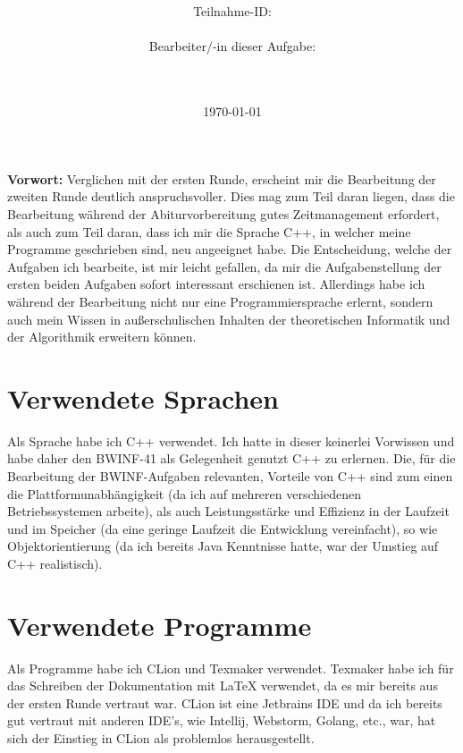 \documentclass[a4paper,10pt,ngerman]{scrartcl}
\title{\textbf{\Huge\Aufgabe}}
\author{\LARGE Teilnahme-ID: \LARGE \TeilnahmeId \\\\
\LARGE Bearbeiter/-in dieser Aufgabe: \\
\LARGE \Name\\\\}
\date{\LARGE\today}
\begin{document}
    \maketitle
    \tableofcontents

    \vspace{0.5cm}

    \textbf{Vorwort:}
    Verglichen mit der ersten Runde, erscheint mir die Bearbeitung der zweiten Runde deutlich anspruchsvoller.
    Dies mag zum Teil daran liegen, dass die Bearbeitung während der Abiturvorbereitung gutes Zeitmanagement erfordert,
    als auch zum Teil daran, dass ich mir die Sprache C++, in welcher meine Programme geschrieben sind, neu angeeignet habe.
    Die Entscheidung, welche der Aufgaben ich bearbeite, ist mir leicht gefallen, da mir die Aufgabenstellung der ersten beiden
    Aufgaben sofort interessant erschienen ist.
    Allerdings habe ich während der Bearbeitung nicht nur eine Programmiersprache erlernt,
    sondern auch mein Wissen in außerschulischen Inhalten der theoretischen Informatik und der Algorithmik erweitern können.

    \section{Verwendete Sprachen}\label{sec:verwendete-sprachen}
    Als Sprache habe ich C++ verwendet.
    Ich hatte in dieser keinerlei Vorwissen und habe daher den BWINF-41 als Gelegenheit genutzt C++ zu erlernen.
    Die, für die Bearbeitung der BWINF-Aufgaben relevanten, Vorteile von C++ sind zum einen die
    Plattformunabhängigkeit (da ich auf mehreren verschiedenen Betriebssystemen arbeite),
    als auch Leistungsstärke und Effizienz in der Laufzeit und im Speicher (da eine geringe Laufzeit die Entwicklung vereinfacht),
    so wie Objektorientierung (da ich bereits Java Kenntnisse hatte, war der Umstieg auf C++ realistisch).


    \section{Verwendete Programme}\label{sec:verwendete-programme}
    Als Programme habe ich CLion und Texmaker verwendet.
    Texmaker habe ich für das Schreiben der Dokumentation mit LaTeX verwendet,
    da es mir bereits aus der ersten Runde vertraut war.
    CLion ist eine Jetbrains IDE und da ich bereits gut vertraut mit anderen IDE's, wie Intellij, Webstorm, Golang, etc.,
    war, hat sich der Einstieg in CLion als problemlos herausgestellt.
\end{document}
